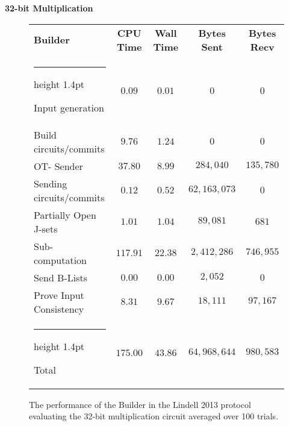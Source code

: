 \documentclass[11pt]{article} %
\makeatletter
\newcommand{\thickhline}{%
    \noalign {\ifnum 0=`}\fi \hrule height 1.4pt
    \futurelet \reserved@a \@xhline
}
\makeatother
\begin{document}
				\FloatBarrier
				\noindent \textbf{32-bit Multiplication}
				\begin{figure}[!ht]
					\begin{tabular}{| p{4.3cm} | c c c c |}
						\hline
						\textbf{Builder} & \textbf{CPU Time} & \textbf{Wall Time} & \textbf{Bytes Sent} & \textbf{Bytes Recv} \\
						\thickhline
						Input generation & $0.09$ & $0.01$ & $0$ & $0$ \\
						\hline
						Build circuits/commits & $9.76$ & $1.24$ & $0$ & $0$ \\
						\hline
						OT- Sender & $37.80$ & $8.99$ & $284,040$ & $135,780$ \\
						\hline
						Sending circuits/commits & $0.12$ & $0.52$ & $62,163,073$ & $0$ \\
						\hline
						Partially Open J-sets & $1.01$ & $1.04$ & $89,081$ & $681$ \\
						\hline
						Sub-computation & $117.91$ & $22.38$ & $2,412,286$ & $746,955$ \\
						\hline
						Send B-Lists & $0.00$ & $0.00$ & $2,052$ & $0$ \\
						\hline
						Prove Input Consistency & $8.31$ & $9.67$ & $18,111$ & $97,167$ \\
						\thickhline
						Total & $175.00$ & $43.86$ & $64,968,644$ & $980,583$ \\
						\hline
					\end{tabular}
					\caption{The performance of the Builder in the Lindell 2013 protocol evaluating the 32-bit multiplication circuit averaged over 100 trials. \label{table:L_2013_Mul_Builder} }
				\end{figure}
				
\end{document}
